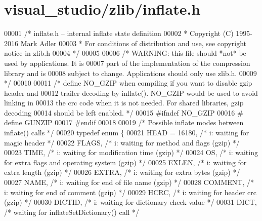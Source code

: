 \hypertarget{visual__studio_2zlib_2inflate_8h_source}{}\section{visual\+\_\+studio/zlib/inflate.h}
\label{visual__studio_2zlib_2inflate_8h_source}

\begin{DoxyCode}
00001 \textcolor{comment}{/* inflate.h -- internal inflate state definition}
00002 \textcolor{comment}{ * Copyright (C) 1995-2016 Mark Adler}
00003 \textcolor{comment}{ * For conditions of distribution and use, see copyright notice in zlib.h}
00004 \textcolor{comment}{ */}
00005 
00006 \textcolor{comment}{/* WARNING: this file should *not* be used by applications. It is}
00007 \textcolor{comment}{   part of the implementation of the compression library and is}
00008 \textcolor{comment}{   subject to change. Applications should only use zlib.h.}
00009 \textcolor{comment}{ */}
00010 
00011 \textcolor{comment}{/* define NO\_GZIP when compiling if you want to disable gzip header and}
00012 \textcolor{comment}{   trailer decoding by inflate().  NO\_GZIP would be used to avoid linking in}
00013 \textcolor{comment}{   the crc code when it is not needed.  For shared libraries, gzip decoding}
00014 \textcolor{comment}{   should be left enabled. */}
00015 \textcolor{preprocessor}{#ifndef NO\_GZIP}
00016 \textcolor{preprocessor}{#  define GUNZIP}
00017 \textcolor{preprocessor}{#endif}
00018 
00019 \textcolor{comment}{/* Possible inflate modes between inflate() calls */}
00020 \textcolor{keyword}{typedef} \textcolor{keyword}{enum} \{
00021     HEAD = 16180,   \textcolor{comment}{/* i: waiting for magic header */}
00022     FLAGS,      \textcolor{comment}{/* i: waiting for method and flags (gzip) */}
00023     TIME,       \textcolor{comment}{/* i: waiting for modification time (gzip) */}
00024     OS,         \textcolor{comment}{/* i: waiting for extra flags and operating system (gzip) */}
00025     EXLEN,      \textcolor{comment}{/* i: waiting for extra length (gzip) */}
00026     EXTRA,      \textcolor{comment}{/* i: waiting for extra bytes (gzip) */}
00027     NAME,       \textcolor{comment}{/* i: waiting for end of file name (gzip) */}
00028     COMMENT,    \textcolor{comment}{/* i: waiting for end of comment (gzip) */}
00029     HCRC,       \textcolor{comment}{/* i: waiting for header crc (gzip) */}
00030     DICTID,     \textcolor{comment}{/* i: waiting for dictionary check value */}
00031     DICT,       \textcolor{comment}{/* waiting for inflateSetDictionary() call */}

\end{DoxyCode}
